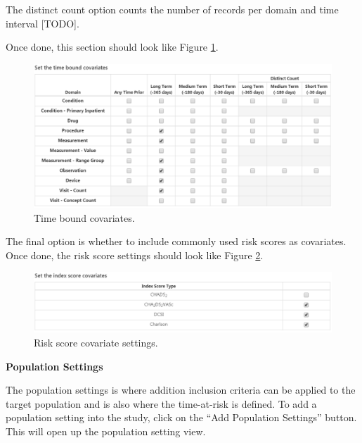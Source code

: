 \documentclass[11pt]{book}
\theoremstyle{definition}
\theoremstyle{definition}
\theoremstyle{definition}
\theoremstyle{remark}
\begin{document}
The distinct count option counts the number of records per domain and time interval {[}TODO{]}.

Once done, this section should look like Figure \ref{fig:covariateSettings5}.

\begin{figure}

{\centering \includegraphics[width=1\linewidth]{images/PatientLevelPrediction/covariateSettings5} 

}

\caption{Time bound covariates.}\label{fig:covariateSettings5}
\end{figure}

The final option is whether to include commonly used risk scores as covariates. Once done, the risk score settings should look like Figure \ref{fig:covariateSettings6}.

\begin{figure}

{\centering \includegraphics[width=1\linewidth]{images/PatientLevelPrediction/covariateSettings6} 

}

\caption{Risk score covariate settings.}\label{fig:covariateSettings6}
\end{figure}

\textbf{Population Settings}

The population settings is where addition inclusion criteria can be applied to the target population and is also where the time-at-risk is defined. To add a population setting into the study, click on the ``Add Population Settings'' button. This will open up the population setting view.
\end{document}
